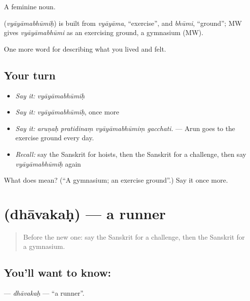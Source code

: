 A feminine noun.

\begin{cousinweb}
\textbf{} (\emph{vyāyāmabhūmiḥ}) is built from \emph{vyāyāma}, \textquotedblleft{}exercise\textquotedblright{}, and \emph{bhūmi}, \textquotedblleft{}ground\textquotedblright{}; MW gives \emph{vyāyāmabhūmi} as an exercising ground, a gymnasium (MW).
\end{cousinweb}

\begin{grammarlens}[title={What you've built}]
One more word for describing what you lived and felt.
\end{grammarlens}

\subsection*{Your turn}
\begin{itemize}
\raggedright
  \item \emph{Say it:} \emph{vyāyāmabhūmiḥ}
  \item \emph{Say it:} \emph{vyāyāmabhūmiḥ}, once more
  \item \emph{Say it:} \emph{aruṇaḥ pratidinaṃ vyāyāmabhūmiṃ gacchati.} — Arun goes to the exercise ground every day.
  \item \emph{Recall:} say the Sanskrit for hoists, then the Sanskrit for a challenge, then say \emph{vyāyāmabhūmiḥ} again
\end{itemize}

\begin{tcolorbox}[breakable,colback=teal!4,colframe=teal!35!black,title={Before you move on}]
What does  mean? (\textquotedblleft{}A gymnasium; an exercise ground\textquotedblright{}.) Say it once more.
\end{tcolorbox}
\section[\texorpdfstring{\sk{धावकः} (dhāvakaḥ)}{धावकः (dhāvakaḥ)}]{ (dhāvakaḥ) — a runner}

\label{lesson:SA-C526-dhavakah}



\begin{quote}
Before the new one: say the Sanskrit for a challenge, then the Sanskrit for a gymnasium.
\end{quote}

\subsection*{You'll want to know: }
\textbf{} — \emph{dhāvakaḥ} — \textquotedblleft{}a runner\textquotedblright{}.

